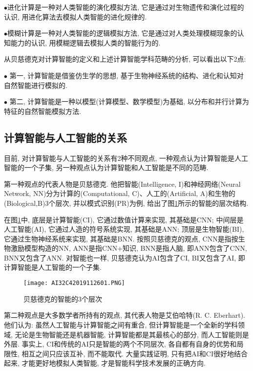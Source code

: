 $\bullet$进化计算是一种对人类智能的演化模拟方法, 它是通过对生物遗传和演化过程的认识, 用进化算法去模拟人类智能的进化规律的.

$\bullet$模糊计算是一种对人类智能的逻辑模拟方法, 它是通过对人类处理模糊现象的认知能力的认识, 用模糊逻辑去模拟人类的智能行为的.

\begin{remark}
从贝慈德克对计算智能的定义和上述计算智能学科范畴的分析, 可以看出以下2点:

$\bullet$ 第一, 计算智能是借鉴仿生学的思想, 基于生物神经系统的结构、进化和认知对自然智能进行模拟的.

$\bullet$ 第二, 计算智能是一种以模型(计算模型、数学模型)为基础, 以分布和并行计算为特征的自然智能模拟方法.
\end{remark}
\subsection{计算智能与人工智能的关系}
目前, 对计算智能与人工智能的关系有2种不同观点, 一种观点认为计算智能是人工智能的一个子集, 另一种观点认为计算智能和人工智能是不同的范畴.

第一种观点的代表人物是贝慈德克. 他把智能(Intelligence, I)和神经网络(Neural Network, NN)分为计算的(Computational, C)、人工的(Artificial, A)和生物的(Biological,B)3个层次, 并以模式识别(PR)为例, 给出了图\ref{AI32fig26000001}所示的智能的层次结构.

在图\ref{AI32fig26000001}中, 底层是计算智能(CI), 它通过数值计算来实现, 其基础是CNN; 中间层是人工智能(AI), 它通过人造的符号系统实现, 其基础是ANN; 顶层是生物智能(BI), 它通过生物神经系统来实现, 其基础是BNN.
按照贝慈德克的观点, CNN是指按生物激励模型构造的NN, ANN是指CNN+知识, BNN是指人脑, 即ANN包含了CNN, BNN又包含了ANN. 对智能也一样, 贝慈德克认为AI包含了CI, BI又包含了AI, 即计算智能是人工智能的一个子集.
\begin{figure}[H]
\centering
\texttt{[image: AI32C42019112601.PNG]}
\caption{贝慈德克的智能的3个层次}
\label{AI32fig26000001}
\end{figure}

第二种观点是大多数学者所持有的观点, 其代表人物是艾伯哈特(R. C. Eberhart). 他们认为: 虽然人工智能与计算智能之间有重合, 但计算智能是一个全新的学科领域, 无论是生物智能还是机器智能, 计算智能都是其最核心的部分, 而人工智能则是外层.
事实上, CI和传统的AI只是智能的两个不同层次, 各自都有自身的优势和局限性, 相互之间只应该互补, 而不能取代.
大量实践证明, 只有把AI和CI很好地结合起来, 才能更好地模拟人类智能, 才是智能科学技术发展的正确方向.
